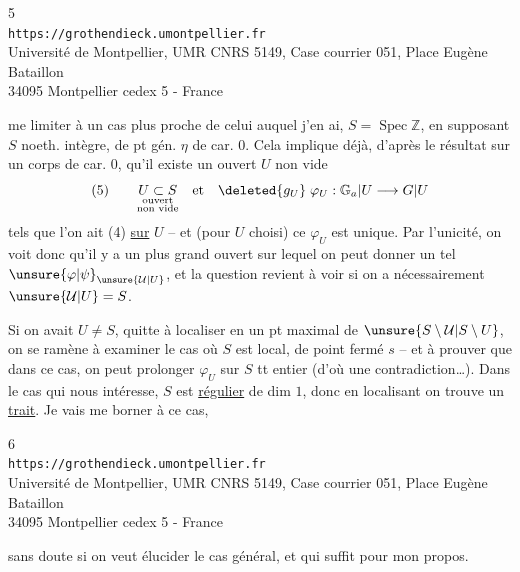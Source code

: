 \begin{center}
\small
5\\
\texttt{https://grothendieck.umontpellier.fr}\\
Université de Montpellier, UMR CNRS 5149, Case courrier 051, Place Eugène Bataillon\\
34095 Montpellier cedex 5 - France
\end{center}

me limiter à un cas plus proche de celui auquel j'en ai, $S=\operatorname{Spec}\mathbb Z$,
en supposant $S$ noeth. intègre,  de pt gén. $\eta$
de car. $0$. Cela implique déjà, d'après le résultat sur un corps de car. $0$,
qu'il existe un ouvert $U$ non vide
\[
(5)\qquad
\underset{\substack{\text{ouvert}\\\text{non vide}}}{U\subset S}
\quad\text{et}\quad
\deleted{g_U}\;\varphi_U:\mathbb G_a\vert U\longrightarrow G\vert U
\]
tels que l'on ait (4) \uline{sur} $U$ -- et (pour $U$ choisi) ce $\varphi_U$
est unique. Par l'unicité, on voit donc qu'il y a un plus grand ouvert
 sur lequel on peut donner un tel
$\unsure{\varphi|\psi}_{\unsure{\mathcal U|U}}$,
et la question revient à voir si on a nécessairement $\unsure{\mathcal U|U}=S$.

Si on avait $U\ne S$, quitte à localiser en un pt maximal de $\unsure{S\setminus\mathcal U|S\setminus U}$,
on  se ramène à examiner le cas où $S$ est local,
de point fermé $s$ -- et à  prouver
que dans ce cas, on peut prolonger $\varphi_U$ sur $S$ tt entier
(d'où une contradiction\ldots). Dans le cas qui nous intéresse, $S$ est
\uline{régulier} de dim $1$, donc en localisant on trouve un \uline{trait}.
Je vais me borner à ce cas, 

\begin{center}
\small
6\\
\texttt{https://grothendieck.umontpellier.fr}\\
Université de Montpellier, UMR CNRS 5149, Case courrier 051, Place Eugène Bataillon\\
34095 Montpellier cedex 5 - France
\end{center}

 sans doute si on veut élucider le cas général, et qui suffit pour
mon propos.


